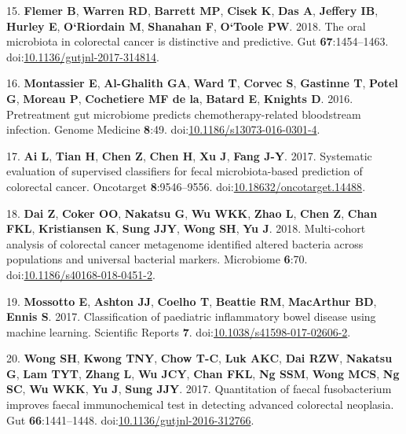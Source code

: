 \documentclass[11pt,]{article}
\begin{document}
\hypertarget{ref-flemer_oral_2018}{}
15. \textbf{Flemer B}, \textbf{Warren RD}, \textbf{Barrett MP},
\textbf{Cisek K}, \textbf{Das A}, \textbf{Jeffery IB}, \textbf{Hurley
E}, \textbf{O`Riordain M}, \textbf{Shanahan F}, \textbf{O`Toole PW}.
2018. The oral microbiota in colorectal cancer is distinctive and
predictive. Gut \textbf{67}:1454--1463.
doi:\href{https://doi.org/10.1136/gutjnl-2017-314814}{10.1136/gutjnl-2017-314814}.

\hypertarget{ref-montassier_pretreatment_2016}{}
16. \textbf{Montassier E}, \textbf{Al-Ghalith GA}, \textbf{Ward T},
\textbf{Corvec S}, \textbf{Gastinne T}, \textbf{Potel G}, \textbf{Moreau
P}, \textbf{Cochetiere MF de la}, \textbf{Batard E}, \textbf{Knights D}.
2016. Pretreatment gut microbiome predicts chemotherapy-related
bloodstream infection. Genome Medicine \textbf{8}:49.
doi:\href{https://doi.org/10.1186/s13073-016-0301-4}{10.1186/s13073-016-0301-4}.

\hypertarget{ref-ai_systematic_2017}{}
17. \textbf{Ai L}, \textbf{Tian H}, \textbf{Chen Z}, \textbf{Chen H},
\textbf{Xu J}, \textbf{Fang J-Y}. 2017. Systematic evaluation of
supervised classifiers for fecal microbiota-based prediction of
colorectal cancer. Oncotarget \textbf{8}:9546--9556.
doi:\href{https://doi.org/10.18632/oncotarget.14488}{10.18632/oncotarget.14488}.

\hypertarget{ref-dai_multi-cohort_2018}{}
18. \textbf{Dai Z}, \textbf{Coker OO}, \textbf{Nakatsu G}, \textbf{Wu
WKK}, \textbf{Zhao L}, \textbf{Chen Z}, \textbf{Chan FKL},
\textbf{Kristiansen K}, \textbf{Sung JJY}, \textbf{Wong SH}, \textbf{Yu
J}. 2018. Multi-cohort analysis of colorectal cancer metagenome
identified altered bacteria across populations and universal bacterial
markers. Microbiome \textbf{6}:70.
doi:\href{https://doi.org/10.1186/s40168-018-0451-2}{10.1186/s40168-018-0451-2}.

\hypertarget{ref-mossotto_classification_2017}{}
19. \textbf{Mossotto E}, \textbf{Ashton JJ}, \textbf{Coelho T},
\textbf{Beattie RM}, \textbf{MacArthur BD}, \textbf{Ennis S}. 2017.
Classification of paediatric inflammatory bowel disease using machine
learning. Scientific Reports \textbf{7}.
doi:\href{https://doi.org/10.1038/s41598-017-02606-2}{10.1038/s41598-017-02606-2}.

\hypertarget{ref-wong_quantitation_2017}{}
20. \textbf{Wong SH}, \textbf{Kwong TNY}, \textbf{Chow T-C}, \textbf{Luk
AKC}, \textbf{Dai RZW}, \textbf{Nakatsu G}, \textbf{Lam TYT},
\textbf{Zhang L}, \textbf{Wu JCY}, \textbf{Chan FKL}, \textbf{Ng SSM},
\textbf{Wong MCS}, \textbf{Ng SC}, \textbf{Wu WKK}, \textbf{Yu J},
\textbf{Sung JJY}. 2017. Quantitation of faecal fusobacterium improves
faecal immunochemical test in detecting advanced colorectal neoplasia.
Gut \textbf{66}:1441--1448.
doi:\href{https://doi.org/10.1136/gutjnl-2016-312766}{10.1136/gutjnl-2016-312766}.
\end{document}
